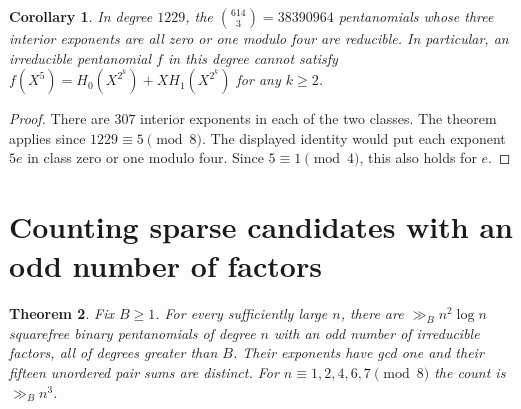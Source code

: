 \documentclass[11pt]{article}
\newtheorem{theorem}{Theorem}
\newtheorem{corollary}[theorem]{Corollary}
\begin{document}
\begin{corollary}
In degree \(1229\), the \(\binom{614}{3}=38390964\) pentanomials whose
three interior exponents are all zero or one modulo four are reducible.
In particular, an irreducible pentanomial \(f\) in this degree cannot
satisfy \(f(X^5)=H_0(X^{2^k})+XH_1(X^{2^k})\) for any \(k\ge2\).
\end{corollary}
\begin{proof}
There are \(307\) interior exponents in each of the two classes.
The theorem applies since \(1229\equiv5\pmod8\). The displayed
identity would put each exponent \(5e\) in class zero or one
modulo four. Since \(5\equiv1\pmod4\), this also holds for \(e\).
\end{proof}

\section{Counting sparse candidates with an odd number of factors}
\label{sec:parity-counts}
\begin{theorem}\label{thm:parity-counts}
Fix \(B\ge1\). For every sufficiently large \(n\), there are
\(\gg_B n^2\log n\) squarefree binary pentanomials of degree \(n\)
with an odd number of irreducible factors, all of degrees greater
than \(B\). Their exponents have gcd one and their fifteen unordered
pair sums are distinct. For \(n\equiv1,2,4,6,7\pmod8\) the count is
\(\gg_B n^3\).
\end{theorem}
\end{document}
